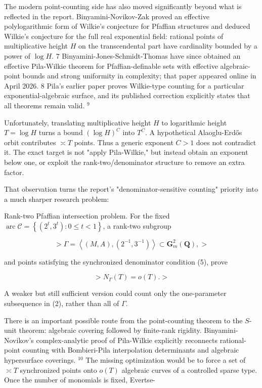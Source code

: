 \documentclass[10pt]{article}
\begin{document}
The modern point-counting side has also moved significantly beyond what is reflected in the report. Binyamini-Novikov-Zak proved an effective polylogarithmic form of Wilkie's conjecture for Pfaffian structures and deduced Wilkie's conjecture for the full real exponential field: rational points of multiplicative height $H$ on the transcendental part have cardinality bounded by a power of $\log H$. 7 Binyamini-Jones-Schmidt-Thomas have since obtained an effective Pila-Wilkie theorem for Pfaffian-definable sets with effective algebraic-point bounds and strong uniformity in complexity; that paper appeared online in April 2026. 8 Pila's earlier paper proves Wilkie-type counting for a particular exponential-algebraic surface, and its published correction explicitly states that all theorems remain valid. ${ }^{9}$

Unfortunately, translating multiplicative height $H$ to logarithmic height $T=\log H$ turns a bound $(\log H)^{C}$ into $T^{C}$. A hypothetical Alaoglu-Erdős orbit contributes $\asymp T$ points. Thus a generic exponent $C>1$ does not contradict it. The exact target is not "apply Pila-Wilkie," but instead obtain an exponent below one, or exploit the rank-two/denominator structure to remove an extra factor.

That observation turns the report's "denominator-sensitive counting" priority into a much sharper research problem:

Rank-two Pfaffian intersection problem. For the fixed $\operatorname{arc} \mathcal{C}=\left\{\left(2^{t}, 3^{t}\right): 0 \leq t<1\right\}$, a rank-two subgroup

$$
>\Gamma=\left\langle(M, A),\left(2^{-1}, 3^{-1}\right)\right\rangle \subset \mathbf{G}_{m}^{2}(\mathbf{Q}),>
$$

and points satisfying the synchronized denominator condition (5), prove

$$
>N_{\Gamma}(T)=o(T) .>
$$

A weaker but still sufficient version could count only the one-parameter subsequence in (2), rather than all of $\Gamma$.

There is an important possible route from the point-counting theorem to the $S$-unit theorem: algebraic covering followed by finite-rank rigidity. Binyamini-Novikov's complex-analytic proof of Pila-Wilkie explicitly reconnects rational-point counting with Bombieri-Pila interpolation determinants and algebraic hypersurface coverings. ${ }^{10}$ The missing optimization would be to force a set of $\asymp T$ synchronized points onto $o(T)$ algebraic curves of a controlled sparse type. Once the number of monomials is fixed, Evertse-
\end{document}
